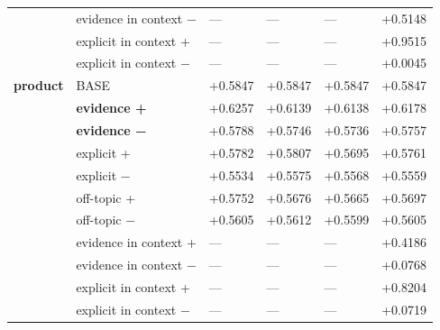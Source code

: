\begin{table}[htbp]
{\begin{tabular}{ llllll }
 & evidence in context − & — & — & — & +0.5148 \\
 & explicit in context + & — & — & — & +0.9515 \\
 & explicit in context − & — & — & — & +0.0045 \\
\textbf{product} & BASE & +0.5847 & +0.5847 & +0.5847 & +0.5847 \\
 & \textbf{evidence +} & +0.6257 & +0.6139 & +0.6138 & +0.6178 \\
 & \textbf{evidence −} & +0.5788 & +0.5746 & +0.5736 & +0.5757 \\
 & explicit + & +0.5782 & +0.5807 & +0.5695 & +0.5761 \\
 & explicit − & +0.5534 & +0.5575 & +0.5568 & +0.5559 \\
 & off-topic + & +0.5752 & +0.5676 & +0.5665 & +0.5697 \\
 & off-topic − & +0.5605 & +0.5612 & +0.5599 & +0.5605 \\
 & evidence in context + & — & — & — & +0.4186 \\
 & evidence in context − & — & — & — & +0.0768 \\
 & explicit in context + & — & — & — & +0.8204 \\
 & explicit in context − & — & — & — & +0.0719 \\
\bottomrule
\end{tabular}
}
\end{table}
